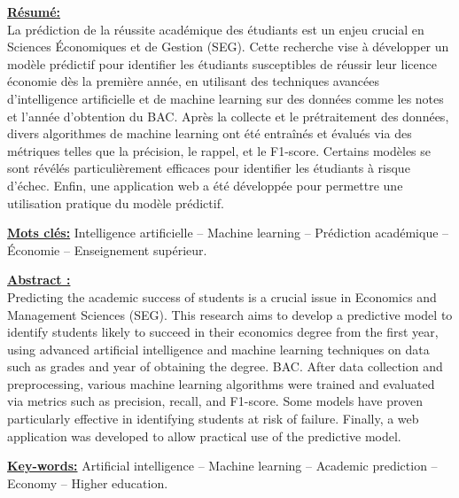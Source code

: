 \fontsize{12pt}{12pt}\selectfont%
\underline{\textbf{Résumé:}}\\
La prédiction de la réussite académique des étudiants est un enjeu crucial en Sciences Économiques et de Gestion (SEG). Cette recherche vise à développer un modèle prédictif pour identifier les étudiants susceptibles de réussir leur licence économie dès la première année, en utilisant des techniques avancées d’intelligence artificielle et de machine learning sur des données comme les notes et l'année d'obtention du BAC. Après la collecte et le prétraitement des données, divers algorithmes de machine learning ont été entraînés et évalués via des métriques telles que la précision, le rappel, et le F1-score. Certains modèles se sont révélés particulièrement efficaces pour identifier les étudiants à risque d'échec. Enfin, une application web a été développée pour permettre une utilisation pratique du modèle prédictif.
\\
\begin{spacing}{1}
\underline{\textbf{Mots clés:}} Intelligence artificielle – Machine learning – Prédiction académique –  Économie – Enseignement supérieur.\\
\end{spacing}
\vspace*{2cm}
\underline{\textbf{Abstract :}}\\
Predicting the academic success of students is a crucial issue in Economics and Management Sciences (SEG). This research aims to develop a predictive model to identify students likely to succeed in their economics degree from the first year, using advanced artificial intelligence and machine learning techniques on data such as grades and year of obtaining the degree. BAC. After data collection and preprocessing, various machine learning algorithms were trained and evaluated via metrics such as precision, recall, and F1-score. Some models have proven particularly effective in identifying students at risk of failure. Finally, a web application was developed to allow practical use of the predictive model.
\\
\par
\begin{spacing}{1}
\underline{\textbf{Key-words:}} Artificial intelligence – Machine learning – Academic prediction – Economy – Higher education.\\
\end{spacing}
\clearpage


    